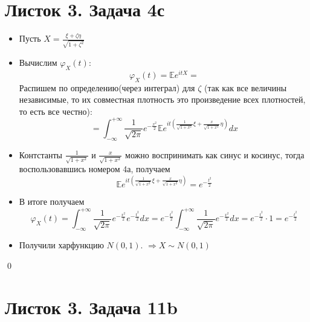 \section{Листок 3. Задача 4с}
\begin{itemize}
\item Пусть $X = \frac{\xi + \zeta \eta}{\sqrt{1 + \zeta ^ 2}}$
\item Вычислим $\varphi_{X}\left(t\right)$:
\[
    \varphi_{X}\left(t\right) = \mathbb{E} e ^ {itX} = 
\]
Распишем по определению(через интеграл) для $\zeta$ (так как все величины независимые, то их совместная плотность это произведение всех плотностей, то есть все честно):
\[
    = \int_{-\infty}^{+\infty} \frac1{\sqrt{2\pi}} e ^ {-\frac {x ^ 2}{2}} \mathbb{E} e ^ {it \left(\frac{1}{\sqrt{1 + x ^ 2}}\xi + \frac{x}{\sqrt{1 + x ^ 2}} \eta\right)} dx
\]
\item Контстанты $\frac{1}{\sqrt{1 + x ^ 2}}$ и $\frac{x}{\sqrt{1 + x ^ 2}}$ можно воспринимать как синус и косинус, тогда воспользовавшись номером 4а, получаем
\[
    \mathbb{E} e ^ {it \left(\frac{1}{\sqrt{1 + x ^ 2}}\xi + \frac{x}{\sqrt{1 + x ^ 2}} \eta\right)} = e ^ {-\frac{t ^ 2}2}
\]
\item В итоге получаем
\[
    \varphi_{X}\left(t\right) = \int_{-\infty}^{+\infty} \frac1{\sqrt{2\pi}} e ^ {-\frac {x ^ 2}{2}} e ^ {-\frac{t ^ 2}{2}}dx = 
    e ^ {-\frac{t ^ 2}{2}} \int_{-\infty}^{+\infty} \frac1{\sqrt{2\pi}} e ^ {-\frac {x ^ 2}{2}} dx = e ^ {-\frac{t ^ 2}{2}} \cdot 1 = e ^ {-\frac{t ^ 2}{2}}
\]
\item Получили харфункцию $N\left(0, 1\right)$. $\Rightarrow X \sim N\left(0, 1\right)$

\end{itemize}
\qed

\section{Листок 3. Задача 11b}

